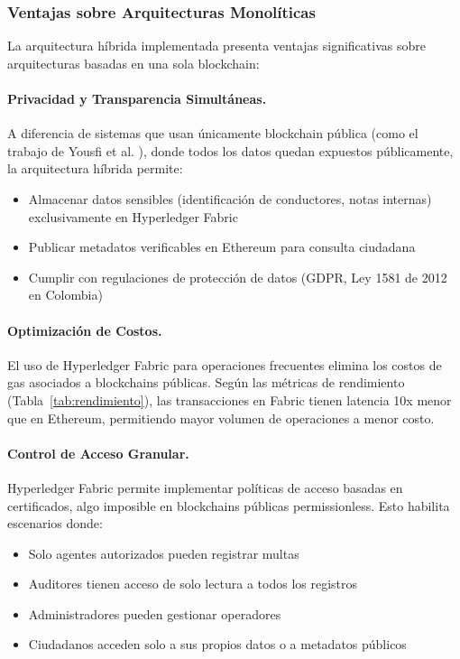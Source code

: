 \subsubsection{Ventajas sobre Arquitecturas Monolíticas}

La arquitectura híbrida implementada presenta ventajas significativas sobre arquitecturas basadas en una sola blockchain:

\paragraph{Privacidad y Transparencia Simultáneas.}
A diferencia de sistemas que usan únicamente blockchain pública (como el trabajo de Yousfi et al. \parencite{yousfi2019blockchain}), donde todos los datos quedan expuestos públicamente, la arquitectura híbrida permite:
\begin{itemize}
    \item Almacenar datos sensibles (identificación de conductores, notas internas) exclusivamente en Hyperledger Fabric
    \item Publicar metadatos verificables en Ethereum para consulta ciudadana
    \item Cumplir con regulaciones de protección de datos (GDPR, Ley 1581 de 2012 en Colombia)
\end{itemize}

\paragraph{Optimización de Costos.}
El uso de Hyperledger Fabric para operaciones frecuentes elimina los costos de gas asociados a blockchains públicas. Según las métricas de rendimiento (Tabla~\ref{tab:rendimiento}), las transacciones en Fabric tienen latencia 10x menor que en Ethereum, permitiendo mayor volumen de operaciones a menor costo.

\paragraph{Control de Acceso Granular.}
Hyperledger Fabric permite implementar políticas de acceso basadas en certificados, algo imposible en blockchains públicas permissionless. Esto habilita escenarios donde:
\begin{itemize}
    \item Solo agentes autorizados pueden registrar multas
    \item Auditores tienen acceso de solo lectura a todos los registros
    \item Administradores pueden gestionar operadores
    \item Ciudadanos acceden solo a sus propios datos o a metadatos públicos
\end{itemize}

